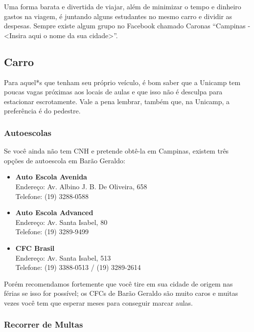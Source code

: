 Uma forma barata e divertida de viajar, além de minimizar o tempo e dinheiro
gastos na viagem, é juntando alguns estudantes no mesmo carro e dividir as
despesas. Sempre existe algum grupo no Facebook chamado Caronas ``Campinas -
<Insira aqui o nome da sua cidade>''.

\subsection{Carro}

Para aquel*s que tenham seu próprio veículo, é bom saber que a Unicamp tem
poucas vagas próximas aos locais de aulas e que isso não é desculpa para
estacionar escrotamente. Vale a pena lembrar, também que, na Unicamp, a
preferência é do pedestre.

\subsubsection{Autoescolas}

Se você ainda não tem CNH e pretende obtê-la em Campinas, existem três opções
de autoescola em Barão Geraldo:

\begin{itemize}
    \item \textbf{Auto Escola Avenida}
        \\Endereço: Av. Albino J. B. De Oliveira, 658
        \\Telefone: (19) 3288-0588

    \item \textbf{Auto Escola Advanced}
        \\Endereço: Av. Santa Isabel, 80
        \\Telefone: (19) 3289-9499

    \item \textbf{CFC Brasil}
        \\Endereço: Av. Santa Isabel, 513
        \\Telefone: (19) 3388-0513 / (19) 3289-2614
\end{itemize}

Porém recomendamos fortemente que você tire em sua cidade de origem nas férias
se isso for possível; os CFCs de Barão Geraldo são muito caros e muitas vezes
você tem que esperar meses para conseguir marcar aulas.

\subsubsection{Recorrer de Multas}

